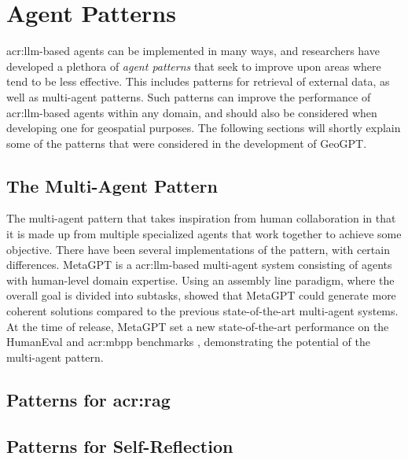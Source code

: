 \section{Agent Patterns}
\label{sec:agent-patterns}

\acrshort{acr:llm}-based agents can be implemented in many ways, and researchers have developed a plethora of \textit{agent patterns} that seek to improve upon areas where  tend to be less effective. This includes patterns for retrieval of external data, as well as multi-agent patterns. Such patterns can improve the performance of \acrshort{acr:llm}-based agents within any domain, and should also be considered when developing one for geospatial purposes. The following sections will shortly explain some of the patterns that were considered in the development of GeoGPT.

\subsection{The Multi-Agent Pattern}

The multi-agent pattern that takes inspiration from human collaboration in that it is made up from multiple specialized agents that work together to achieve some objective. There have been several implementations of the pattern, with certain differences. MetaGPT \citep{hongMetaGPTMetaProgramming2023} is a \acrshort{acr:llm}-based multi-agent system consisting of agents with human-level domain expertise. Using an assembly line paradigm, where the overall goal is divided into subtasks, \citeauthor{hongMetaGPTMetaProgramming2023} showed that MetaGPT could generate more coherent solutions compared to the previous state-of-the-art multi-agent systems. At the time of release, MetaGPT set a new state-of-the-art performance on the HumanEval and \acrshort{acr:mbpp} benchmarks \citep[7]{hongMetaGPTMetaProgramming2023}, demonstrating the potential of the multi-agent pattern.

\subsection[Patterns for Retrieval-Augmented Generation]{Patterns for \acrlong{acr:rag}}

\subsection{Patterns for Self-Reflection}







\glsresetall
